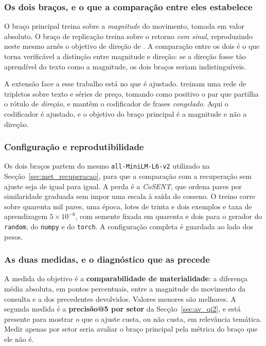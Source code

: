 \subsubsection*{Os dois braços, e o que a comparação entre eles estabelece}

O braço principal treina sobre a \emph{magnitude} do movimento, tomada em valor absoluto. O braço
de replicação treina sobre o retorno \emph{com sinal}, reproduzindo neste mesmo arnês o objetivo
de direção de \textcite{du2024contrastive}. A comparação entre os dois é o que torna
verificável a distinção
entre magnitude e direção: se a direção fosse tão aprendível do texto como a magnitude, os dois
braços seriam indistinguíveis.

A extensão face a esse trabalho está no que é ajustado. \textcite{du2024contrastive} treinam
uma rede de tripletos sobre texto e séries de preço, tomando como positivo o par que partilha
o rótulo de \emph{direção}, e mantêm o codificador de frases \emph{congelado}. Aqui o
codificador é ajustado, e o objetivo do braço principal é a magnitude e não a direção.

\subsubsection*{Configuração e reprodutibilidade}

Os dois braços partem do mesmo \texttt{all-MiniLM-L6-v2} utilizado na
Secção~\ref{sec:met_recuperacao}, para que a comparação com a recuperação sem ajuste seja de igual
para igual. A perda é a \emph{CoSENT}, que ordena pares por similaridade graduada sem impor uma
escala à saída do cosseno. O treino corre sobre quarenta mil pares, uma época, lotes de trinta e
dois exemplos e taxa de aprendizagem $5 \times 10^{-6}$, com semente fixada em quarenta e dois
para o gerador do \texttt{random}, do \texttt{numpy} e do \texttt{torch}. A configuração completa
é guardada ao lado dos pesos.

\subsubsection*{As duas medidas, e o diagnóstico que as precede}

A medida do objetivo é a \textbf{comparabilidade de materialidade}: a diferença média absoluta,
em pontos percentuais, entre a magnitude do movimento da consulta e a dos precedentes devolvidos.
Valores menores são melhores. A segunda medida é a \textbf{precisão@5 por setor} da
Secção~\ref{sec:av_qi2}, e está presente para mostrar o que o ajuste custa, ou não custa,
em relevância temática. Medir apenas por setor seria avaliar o braço principal pela métrica do
braço que ele não é.

